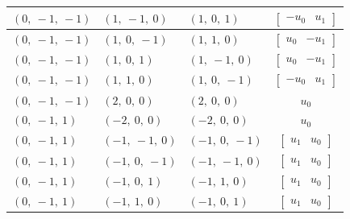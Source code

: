\documentclass[11pt]{article}
\theoremstyle{definition}
\begin{document}
\begin{longtable}{|l|l|l|c|}
    \hline
    $\left( 0, \  -1, \  -1\right)$ & $\left( 1, \  -1, \  0\right)$ & $\left( 1, \  0, \  1\right)$ & $\left[\begin{matrix}- u_{0} & u_{1}\end{matrix}\right]$ \\
    \hline
    $\left( 0, \  -1, \  -1\right)$ & $\left( 1, \  0, \  -1\right)$ & $\left( 1, \  1, \  0\right)$ & $\left[\begin{matrix}u_{0} & - u_{1}\end{matrix}\right]$ \\
    \hline
    $\left( 0, \  -1, \  -1\right)$ & $\left( 1, \  0, \  1\right)$ & $\left( 1, \  -1, \  0\right)$ & $\left[\begin{matrix}u_{0} & - u_{1}\end{matrix}\right]$ \\
    \hline
    $\left( 0, \  -1, \  -1\right)$ & $\left( 1, \  1, \  0\right)$ & $\left( 1, \  0, \  -1\right)$ & $\left[\begin{matrix}- u_{0} & u_{1}\end{matrix}\right]$ \\
    \hline
    $\left( 0, \  -1, \  -1\right)$ & $\left( 2, \  0, \  0\right)$ & $\left( 2, \  0, \  0\right)$ & $u_{0}$ \\
    \hline
    $\left( 0, \  -1, \  1\right)$ & $\left( -2, \  0, \  0\right)$ & $\left( -2, \  0, \  0\right)$ & $u_{0}$ \\
    \hline
    $\left( 0, \  -1, \  1\right)$ & $\left( -1, \  -1, \  0\right)$ & $\left( -1, \  0, \  -1\right)$ & $\left[\begin{matrix}u_{1} & u_{0}\end{matrix}\right]$ \\
    \hline
    $\left( 0, \  -1, \  1\right)$ & $\left( -1, \  0, \  -1\right)$ & $\left( -1, \  -1, \  0\right)$ & $\left[\begin{matrix}u_{1} & u_{0}\end{matrix}\right]$ \\
    \hline
    $\left( 0, \  -1, \  1\right)$ & $\left( -1, \  0, \  1\right)$ & $\left( -1, \  1, \  0\right)$ & $\left[\begin{matrix}u_{1} & u_{0}\end{matrix}\right]$ \\
    \hline
    $\left( 0, \  -1, \  1\right)$ & $\left( -1, \  1, \  0\right)$ & $\left( -1, \  0, \  1\right)$ & $\left[\begin{matrix}u_{1} & u_{0}\end{matrix}\right]$ \\

\end{longtable}
\end{document}
